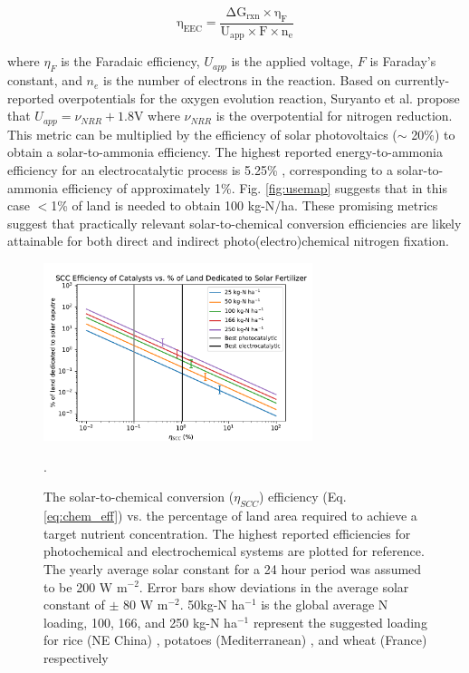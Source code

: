 \begin{equation}
\label{eq:echem_eff}
\mathrm{
\eta_{EEC} = \frac{\Delta G_{rxn} \times \eta_{F}}{U_{app} \times F \times n_e }
}
\end{equation}

where $\eta_{F}$ is the Faradaic efficiency, $U_{app}$ is the applied voltage, $F$ is Faraday's constant, and $n_e$ is the number of electrons in the reaction. Based on currently-reported overpotentials for the oxygen evolution reaction, Suryanto et al. propose that $U_{app} = \nu_{NRR} + 1.8 \mathrm{V}$ where $\nu_{NRR}$ is the overpotential for nitrogen reduction. \cite{Suryanto_2019} This metric can be multiplied by the efficiency of solar photovoltaics ($\sim$ 20\%) to obtain a solar-to-ammonia efficiency. The highest reported energy-to-ammonia efficiency for an electrocatalytic process is 5.25\% \cite{Song_2018}, corresponding to a solar-to-ammonia efficiency of approximately 1\%. Fig. \ref{fig:usemap} suggests that in this case $<$1\% of land is needed to obtain 100 kg-N/ha. These promising metrics suggest that practically relevant solar-to-chemical conversion efficiencies are likely attainable for both direct and indirect photo(electro)chemical nitrogen fixation.


\begin{figure}
    \centering
    \includegraphics[width=0.7\textwidth]{Figures/footprint.pdf}
    \caption{The solar-to-chemical conversion ($\eta_{SCC}$) efficiency (Eq. \ref{eq:chem_eff}) vs. the percentage of land area required to achieve a target nutrient concentration. The highest reported efficiencies for photochemical \cite{Shiraishi_2018} and electrochemical \cite{Song_2018} systems are plotted for reference. The yearly average solar constant for a 24 hour period was assumed to be 200 W m$^{-2}$. Error bars show deviations in the average solar constant of $\pm$ 80 W m$^{-2}$. 50kg-N ha$^{-1}$ is the global average N loading, 100, 166, and 250 kg-N ha$^{-1}$ represent the suggested loading for rice (NE China) \cite{HUANG_2018}, potatoes (Mediterranean) \cite{Waller_2016}, and wheat (France) respectively \cite{Stockle_1997}}.
    \label{fig:eff_footprint}
\end{figure}



